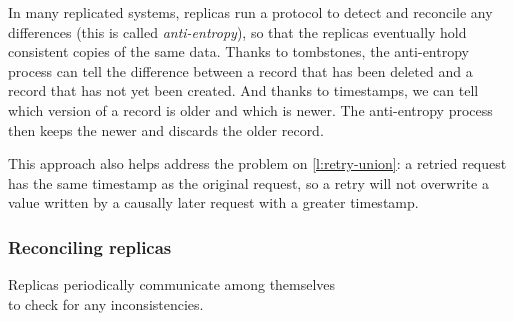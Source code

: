 In many replicated systems, replicas run a protocol to detect and reconcile any differences (this is called \emph{anti-entropy}), so that the replicas eventually hold consistent copies of the same data.
Thanks to tombstones, the anti-entropy process can tell the difference between a record that has been deleted and a record that has not yet been created.
And thanks to timestamps, we can tell which version of a record is older and which is newer.
The anti-entropy process then keeps the newer and discards the older record.

This approach also helps address the problem on \autoref{l:retry-union}: a retried request has the same timestamp as the original request, so a retry will not overwrite a value written by a causally later request with a greater timestamp.

\begin{frame}
    \label{s:reconcile}
    \frametitle{Reconciling replicas}
    \begin{center}
        Replicas periodically communicate among themselves\\to check for any inconsistencies.\\[1em]
        \\[1em]
    \end{center}%
\end{frame}
\label{l:reconcile}

